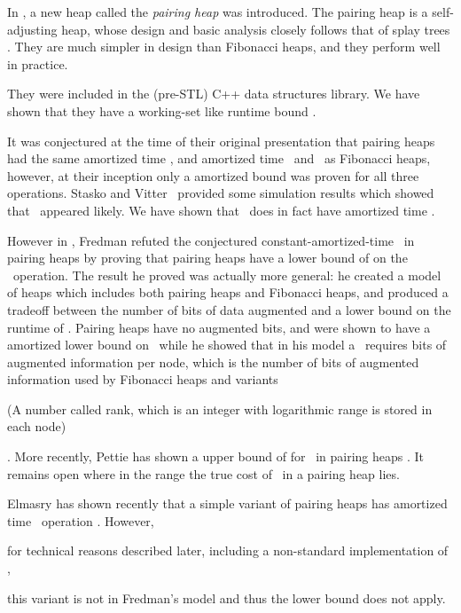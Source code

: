 In \cite{DBLP:journals/algorithmica/FredmanSST86}, a new heap called the \emph{pairing heap} was introduced. The pairing heap is a self-adjusting heap, whose design and basic analysis closely follows that of splay trees \cite{DBLP:journals/jacm/SleatorT85}. They are much simpler in design than Fibonacci heaps, and they perform well in practice.
\begin{fullonly}
 They were included in the (pre-STL) C++ data structures library. We have shown that they have a working-set like runtime bound \cite{DBLP:conf/swat/Iacono00}. 
\end{fullonly}

It was conjectured at the time of their original presentation that pairing heaps had the same  amortized time \opEm, and  amortized time \opIns\ and \opDc\ as Fibonacci heaps, however, at their inception only a  amortized bound was proven for all three operations. Stasko and Vitter~\cite{DBLP:journals/cacm/StaskoV87} provided some simulation results which showed that  \opDc\ appeared likely. We have shown that \opIns\ does in fact have  amortized time \cite{DBLP:journals/corr/abs-1110-4428,DBLP:conf/swat/Iacono00}. 

However in \cite{DBLP:journals/jacm/Fredman99}, Fredman refuted the conjectured constant-amortized-time \opDc\ in pairing heaps by proving that pairing heaps have a lower bound of  on the \opDc\ operation. The result he proved was actually more general: he created a model of heaps which includes both pairing heaps and Fibonacci heaps, and produced a tradeoff between the number of bits of data augmented and a lower bound on the runtime of \opDc. Pairing heaps have no augmented bits, and were shown to have a  amortized lower bound on \opDc\ while he showed that in his model a  \opDc\ requires  bits of augmented information per node, which is the number of bits of augmented information used by Fibonacci heaps and variants\begin{fullonly}
 (A number called rank, which is an integer with logarithmic range is stored in each node)\end{fullonly}
 . More recently, Pettie has shown a upper bound of   for \opDc\ in pairing heaps \cite{DBLP:conf/focs/Pettie05}. It remains open where in the range  the true cost of \opDc\ in a pairing heap lies.

Elmasry has shown recently that a simple variant of pairing heaps has  amortized time \opDc\ operation \cite{DBLP:conf/esa/Elmasry10,DBLP:conf/soda/Elmasry09}. However, 
\begin{fullonly}
for technical reasons described later, including a non-standard implementation of \opDc, 
\end{fullonly}
this variant is not in Fredman's model and thus the  lower bound does not apply. 

